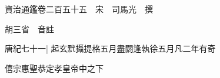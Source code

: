 






























































資治通鑑卷二百五十五　宋　司馬光　撰

胡三省　音註

唐紀七十一|{
	起玄黓攝提格五月盡閼逢執徐五月凡二年有奇}


僖宗惠聖恭定孝皇帝中之下

